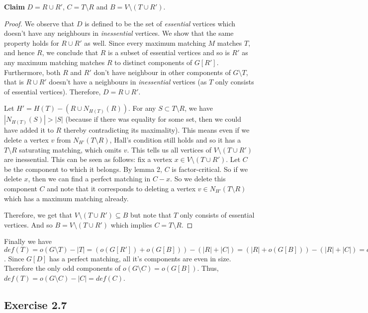 \documentclass[12pt]{article}
\newcommand*{\union}{\cup}
\begin{document}
\textbf{Claim} $D = R \union R'$, $C = T \setminus R$ and $B = V \setminus (T \union R')$.
\begin{proof}
We observe that $D$ is defined to be the set of \textsl{essential} vertices which doesn't have any neighbours in \textsl{inessential} vertices. We show that the same property holds for $R \union R'$ as well. Since every maximum matching $M$ matches $T$, and hence $R$, we conclude that $R$ is a subset of essential vertices and so is $R'$ as any maximum matching matches $R$ to distinct components of $G[R']$. Furthermore, both $R$ and $R'$ don't have neighbour in other components of $G \setminus T$, that is $R \union R'$ doesn't have a neighbours in \textsl{inessential} vertices (as $T$ only consists of essential vertices). Therefore, $D = R \union R'$.

Let $H' = H(T) - (R \union N_{H(T)}(R))$. For any $S \subset T \setminus R$, we have $|N_{H(T)}(S)| > |S|$ (because if there was equality for some set, then we could have added it to $R$ thereby contradicting its maximality). This means even if we delete a vertex $v$ from $N_{H'}(T \setminus R)$, Hall's condition still holds and so it has a $T \setminus R$ saturating matching, which omits $v$. This tells us all vertices of $V \setminus (T \union R')$ are inessential. This can be seen as follows: fix a vertex $x \in V \setminus (T \union R')$. Let $C$ be the component to which it belongs. By lemma 2, $C$ is factor-critical. So if we delete $x$, then we can find a perfect matching in $C - x$. So we delete this component $C$ and note that it corresponds to deleting a vertex $v \in N_{H'}(T \setminus R)$ which has a maximum matching already.

Therefore, we get that $V \setminus (T \union R') \subseteq B$ but note that $T$ only consists of essential vertices. And so $B = V \setminus (T \union R')$ which implies $C = T \setminus R$.
\end{proof}

Finally we have $def(T) = o(G \setminus T) - |T| = (o(G[R']) + o(G[B])) - (|R| + |C|) = (|R| + o(G[B])) - (|R| + |C|) = o(G[B])-|C|$. Since $G[D]$ has a perfect matching, all it's components are even in size. Therefore the only odd components of $o(G \setminus C) = o(G[B])$. Thus, $def(T) = o(G \setminus C) - |C| = def(C)$.

\subsection*{Exercise 2.7}
\end{document}
